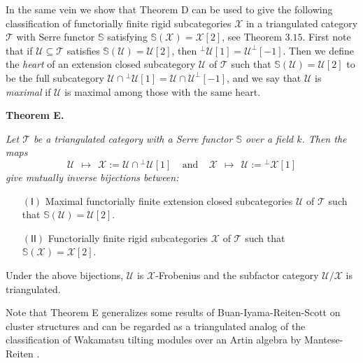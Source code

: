 \documentclass[oneside, a4paper,reqno]{amsart}
\numberwithin{equation}{section}
\theoremstyle{definition}
\begin{document}
In the same vein we show that Theorem D can be used to give the following classification of functorially finite rigid subcategories ${\mathcal X}$ in a triangulated category ${\mathcal T}$ with Serre functor $\mathbb S$ satisfying $\mathbb S({\mathcal X}) = {\mathcal X}[2]$, see Theorem $3.15$.  First note that if  ${\mathcal U}\subseteq {\mathcal T}$ satisfies $\mathbb S({\mathcal U}) = {\mathcal U}[2]$, then ${^{\bot}}{\mathcal U}[1] = {\mathcal U}^{\bot}[-1]$.  Then we define  the {\em heart} of an extension closed subcategory ${\mathcal U}$ of ${\mathcal T}$ such that $\mathbb S({\mathcal U}) = {\mathcal U}[2]$ to be the full subcategory ${\mathcal U} \cap {^{\bot}}{\mathcal U}[1] = {\mathcal U} \cap {\mathcal U}^{\bot}[-1]$, and we say that ${\mathcal U}$ is {\em maximal} if ${\mathcal U}$ is maximal among those with the same heart.   
 

\medskip 

{\bf Theorem E.} {\em Let ${\mathcal T}$ be a triangulated category with a Serre functor $\mathbb S$ over a field $k$. Then the maps
\[
{\mathcal U} \ \ \longmapsto \ \ {\mathcal X} := {\mathcal U} \cap {^{\bot}}{\mathcal U}[1]  \ \ \ \ \  \text{and} \ \ \ \ \ {\mathcal X} \ \ \longmapsto \ \ {\mathcal U} := {^{\bot}}{\mathcal X}[1] 
\]
give mutually inverse bijections between:
\begin{enumerate}
\item[$\mathsf{(I)}$] Maximal functorially finite extension closed subcategories ${\mathcal U}$ of ${\mathcal T}$ such that $\mathbb S({\mathcal U}) = {\mathcal U}[2]$.     
\item[$\mathsf{(II)}$] Functorially finite rigid subcategories ${\mathcal X}$ of ${\mathcal T}$ such that $\mathbb S({\mathcal X}) = {\mathcal X}[2]$.   
\end{enumerate}
Under the above bijections, ${\mathcal U}$ is ${\mathcal X}$-Frobenius and the subfactor category ${\mathcal U}/{\mathcal X}$ is triangulated.} 

\medskip

Note that Theorem E generalizes some results of Buan-Iyama-Reiten-Scott \cite{BIRS} on cluster structures and   can be regarded as a triangulated analog of the classification of Wakamatsu tilting modules over an Artin algebra by Mantese-Reiten \cite{MR}.
\end{document}
